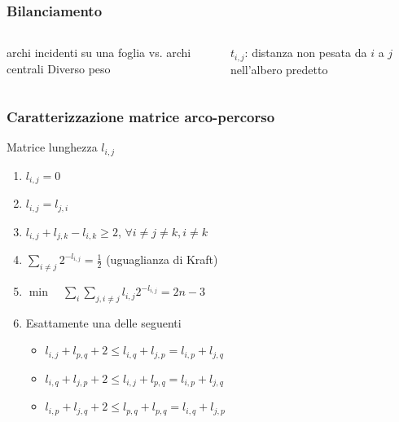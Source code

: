 \begin{frame}
    \frametitle{Bilanciamento}
    \begin{columns}
        \begin{column}{0.48\textwidth}
            \begin{block}{archi incidenti su una foglia vs.
                    archi centrali}
                Diverso peso
            \end{block}
        \end{column}
        \begin{column}{0.48\textwidth}

            $t_{i,j}$: distanza non pesata da $i$ a $j$ nell'albero predetto

        \end{column}
    \end{columns}
\end{frame}

\begin{frame}
    \frametitle{Caratterizzazione matrice arco-percorso}
    \begin{block}{Matrice lunghezza $l_{i,j}$}
        \begin{enumerate}
            \item $l_{i,j} = 0$
            \item $l_{i,j} = l_{j,i}$
            \item $l_{i,j} + l_{j,k} - l_{i,k} \geq  2$, $\forall i\ne j\ne k, i\neq k$
			\item $\sum_{i\ne j} 2^{-l_{i,j}} = \frac{1}{2}$ \hspace{1em}(uguaglianza di Kraft)
            \item     $\min\quad \sum_{i} \sum_{j, i\ne j} l_{i,j} 2^{- l_{i,j}} = 2n -3$
            \item Esattamente una delle seguenti
                  \begin{itemize}
                      \item $l_{i,j} + l_{p,q} + 2 \le l_{i,q} + l_{{j,p}}  = l_{i,p} + l_{{j,q}} $
                      \item $l_{i,q} + l_{j,p} + 2 \le l_{i,j} + l_{{p,q}}  = l_{i,p} + l_{{j,q}} $
                      \item $l_{i,p} + l_{j,q} + 2 \le l_{p,q} + l_{{p,q}}  = l_{i,q} + l_{{j,p}} $
                  \end{itemize}
        \end{enumerate}
    \end{block}
\end{frame}

